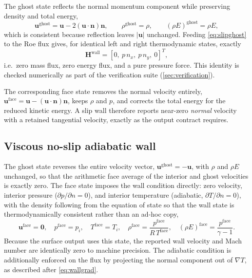 The ghost state reflects the normal momentum component while preserving density
and total energy,
\begin{equation}
  \mathbf{u}^{\mathrm{ghost}}=\mathbf{u}-2(\mathbf{u}\!\cdot\!\mathbf{n})\mathbf{n},
  \qquad
  \rho^{\mathrm{ghost}}=\rho,\qquad
  (\rho E)^{\mathrm{ghost}}=\rho E,
  \label{eq:slipghost}
\end{equation}
which is consistent because reflection leaves $|\mathbf{u}|$ unchanged. Feeding
\cref{eq:slipghost} to the Roe flux gives, for identical left and right
thermodynamic states, exactly
\begin{equation}
  \mathbf{H}^{\mathrm{wall}}=\left[0,\ p\,n_x,\ p\,n_y,\ 0\right]^T,
  \label{eq:slipflux}
\end{equation}
i.e.\ zero mass flux, zero energy flux, and a pure pressure force. This identity
is checked numerically as part of the verification suite
(\cref{sec:verification}).

The corresponding face state removes the normal velocity entirely,
$\mathbf{u}^{\mathrm{face}}=\mathbf{u}-(\mathbf{u}\!\cdot\!\mathbf{n})\mathbf{n}$,
keeps $\rho$ and $p$, and corrects the total energy for the reduced kinetic
energy. A slip wall therefore reports near-zero \emph{normal} velocity with a
retained tangential velocity, exactly as the output contract requires.

\subsection{Viscous no-slip adiabatic wall}

The ghost state reverses the entire velocity vector,
$\mathbf{u}^{\mathrm{ghost}}=-\mathbf{u}$, with $\rho$ and $\rho E$ unchanged, so
that the arithmetic face average of the interior and ghost velocities is exactly
zero. The face state imposes the wall condition directly: zero velocity,
interior pressure ($\partial p/\partial n=0$), and interior temperature
(adiabatic, $\partial T/\partial n=0$), with the density following from the
equation of state so that the wall state is thermodynamically consistent rather
than an ad-hoc copy,
\begin{equation}
  \mathbf{u}^{\mathrm{face}}=\mathbf{0},\quad
  p^{\mathrm{face}}=p_i,\quad
  T^{\mathrm{face}}=T_i,\quad
  \rho^{\mathrm{face}}=\frac{p^{\mathrm{face}}}{R\,T^{\mathrm{face}}},\quad
  (\rho E)^{\mathrm{face}}=\frac{p^{\mathrm{face}}}{\gamma-1}.
  \label{eq:noslipface}
\end{equation}
Because the surface output uses this state, the reported wall velocity and Mach
number are identically zero to machine precision. The adiabatic condition is
additionally enforced on the flux by projecting the normal component out of
$\nabla T$, as described after \cref{eq:wallgrad}.

